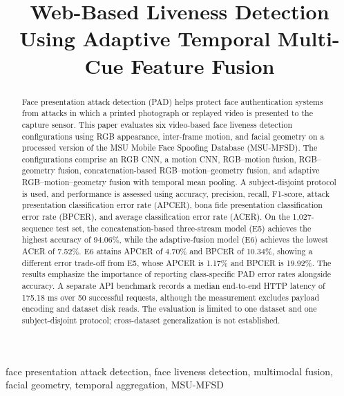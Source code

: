 \documentclass[a4paper,conference]{IEEEtran}
\begin{document}
\title{Web-Based Liveness Detection Using Adaptive Temporal Multi-Cue Feature Fusion}


\maketitle

\begin{abstract}
Face presentation attack detection (PAD) helps protect face authentication systems from attacks in which a printed photograph or replayed video is presented to the capture sensor. This paper evaluates six video-based face liveness detection configurations using RGB appearance, inter-frame motion, and facial geometry on a processed version of the MSU Mobile Face Spoofing Database (MSU-MFSD). The configurations comprise an RGB CNN, a motion CNN, RGB--motion fusion, RGB--geometry fusion, concatenation-based RGB--motion--geometry fusion, and adaptive RGB--motion--geometry fusion with temporal mean pooling. A subject-disjoint protocol is used, and performance is assessed using accuracy, precision, recall, F1-score, attack presentation classification error rate (APCER), bona fide presentation classification error rate (BPCER), and average classification error rate (ACER). On the 1,027-sequence test set, the concatenation-based three-stream model (E5) achieves the highest accuracy of 94.06\%, while the adaptive-fusion model (E6) achieves the lowest ACER of 7.52\%. E6 attains APCER of 4.70\% and BPCER of 10.34\%, showing a different error trade-off from E5, whose APCER is 1.17\% and BPCER is 19.92\%. The results emphasize the importance of reporting class-specific PAD error rates alongside accuracy. A separate API benchmark records a median end-to-end HTTP latency of 175.18 ms over 50 successful requests, although the measurement excludes payload encoding and dataset disk reads. The evaluation is limited to one dataset and one subject-disjoint protocol; cross-dataset generalization is not established.
\end{abstract}

\begin{IEEEkeywords}
face presentation attack detection, face liveness detection, multimodal fusion, facial geometry, temporal aggregation, MSU-MFSD
\end{IEEEkeywords}
\end{document}
